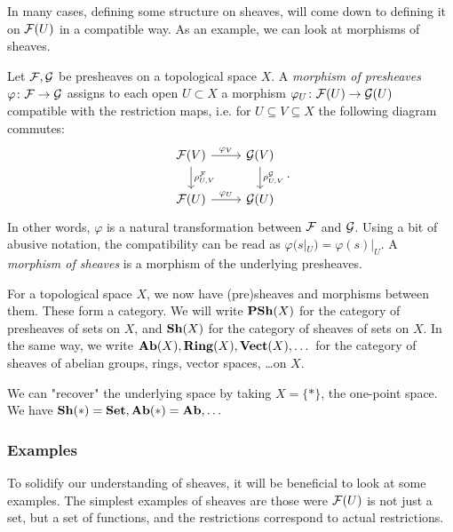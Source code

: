 \documentclass{article}
\begin{document}
In many cases, defining some structure on sheaves, will come down
to defining it on $\mathcal{F}(U)$ in a compatible way.
As an example, we can look at morphisms of sheaves.
\begin{definition}
    Let $\mathcal{F}, \mathcal{G}$ be presheaves on a topological space $X$.
    A  \emph{morphism of presheaves} $\varphi \colon \mathcal{F} \to \mathcal{G}$ assigns to
    each open $U\subset X$ a morphism $\varphi_U \colon \mathcal{F}(U) \to \mathcal{G}(U)$
    compatible with the restriction maps, i.e. for $U\subseteq V \subseteq X$
    the following diagram commutes:
    \begin{equation*}
        \begin{tikzcd}
            \mcF(V) \rar["\varphi_V"] \dar["\rho^\mcF_{U,V}"]
            & \mcG(V) \dar["\rho^\mcG_{U,V}"] \\
            \mcF(U) \rar["\varphi_U"]
            & \mcG(U)
        \end{tikzcd}.
    \end{equation*}
    In other words, $\varphi$ is a natural transformation between $\mathcal{F}$ and $\mathcal{G}$.
    Using a bit of abusive notation, the compatibility can be read as
    $\varphi(s|_U) = \varphi(s)|_U$.
    A \emph{morphism of sheaves} is a morphism of the underlying presheaves.
\end{definition}

For a topological space $X$, we now have (pre)sheaves and morphisms between them.
These form a category. We will write $\operatorname{\mathbf{PSh}}(X)$ for the category of presheaves of
sets on $X$, and $\operatorname{\mathbf{Sh}}(X)$ for the category of sheaves of sets on $X$.
In the same way, we write $\operatorname{\mathbf{Ab}}(X), \operatorname{\mathbf{Ring}}(X), \operatorname{\mathbf{Vect}}(X),\dots $ for the category of
sheaves of abelian groups, rings, vector spaces, \dots on $X$.
\begin{remark}
    We can "recover" the underlying space by taking $X = \{*\}$,
    the one-point space. We have $\operatorname{\mathbf{Sh}}(*) = \operatorname{\mathbf{Set}}, \operatorname{\mathbf{Ab}}(*) = \operatorname{\mathbf{Ab}}, \dots$
\end{remark}

\subsubsection{Examples}
To solidify our understanding of sheaves, it will be beneficial to look
at some examples.
The simplest examples of sheaves are those were
$\mathcal{F}(U)$ is not just a set, but a set of functions, and the
restrictions correspond to actual restrictions.
\end{document}
